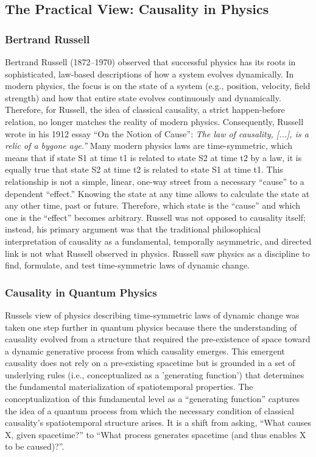 \subsection{The Practical View: Causality in Physics}
\label{sec:philosophy_physics}

\subsubsection{Bertrand Russell}
\label{sec:history_Russell}

Bertrand Russell (1872--1970) observed that successful physics has its roots in sophisticated, law-based descriptions of how a system evolves dynamically. In modern physics, the focus is on the state of a system (e.g., position, velocity, field strength) and how that entire state evolves continuously and dynamically. Therefore, for Russell, the idea of classical causality, a strict happen-before relation, no longer matches the reality of modern physics. Consequently, Russell wrote in his 1912 essay ``On the Notion of Cause''\cite{RussellOnCause}:  \textit{The law of causality, [...], is a relic of a bygone age.''} 
Many modern physics laws are time-symmetric, which means that if state S1 at time t1 is related to state S2 at time t2 by a law, it is equally true that state S2 at time t2 is related to state S1 at time t1. This relationship is not a simple, linear, one-way street from a necessary ``cause'' to a dependent ``effect.'' Knowing the state at any time allows to calculate the state at any other time, past or future. Therefore, which state is the ``cause'' and which one is the ``effect'' becomes arbitrary. Russell was not opposed to causality itself; instead, his primary argument was that the traditional philosophical interpretation of causality as a fundamental, temporally asymmetric, and directed link is not what Russell observed in physics. Russell saw physics as a discipline to find, formulate, and test time-symmetric laws of dynamic change. 

\subsubsection{Causality in Quantum Physics}

Russels view of physics describing time-symmetric laws of dynamic change was taken one step further in quantum physics because there the understanding of causality evolved from a structure that required the pre-existence of space toward a dynamic generative process from which causality emerges\cite{mrini2024indefinitecausalstructurecausal}. This emergent causality does not rely on a pre-existing spacetime but is grounded in a set of underlying rules (i.e., conceptualized as a 'generating function') that determines the fundamental materialization of spatiotemporal properties. The conceptualization of this fundamental level as a ``generating function'' captures the idea of a quantum process from which the necessary condition of classical causality's spatiotemporal structure arises. It is a shift from asking, ``What causes X, given spacetime?'' to ``What process generates spacetime (and thus enables X to be caused)?''.


